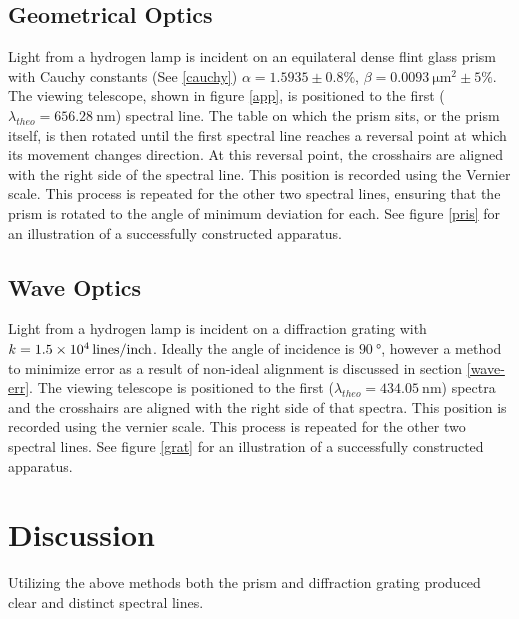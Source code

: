 \documentclass[10pt, twocolumn]{article}
\theoremstyle{definition}
\begin{document}
\subsection{Geometrical Optics}
Light from a hydrogen lamp is incident on an equilateral dense flint glass prism with Cauchy constants (See \eqref{cauchy})
$\alpha=1.5935\pm0.8\%$, $\beta=\qty{0.0093}{\micro\meter\squared}\pm5\%$. The viewing telescope, shown in figure \ref{app}, is positioned to the first ($\lambda_{theo}=\qty{656.28}{\nano\meter}$)
spectral line. The table on which the prism sits, or the prism itself, is then rotated until the first spectral line reaches a reversal point at which its movement changes direction.
At this reversal point, the crosshairs are aligned with the right side of the spectral line. This position is recorded using the Vernier scale. This process is repeated for the other two spectral lines,
ensuring that the prism is rotated to the angle of minimum deviation for each. See figure \ref{pris} for an illustration of a successfully constructed apparatus.
\subsection{Wave Optics}
Light from a hydrogen lamp is incident on a diffraction grating with $k=\qty{1.5d4}{lines\per inch}$. Ideally the angle of incidence is $\qty{90}{\degree}$,
however a method to minimize error as a result of non-ideal alignment is discussed in section \ref{wave-err}.
The viewing telescope is positioned to the first ($\lambda_{theo}=\qty{434.05}{\nano\meter}$) spectra and the crosshairs are aligned with the right side of
that spectra. This position is recorded using the vernier scale. This process is repeated for the other two spectral lines. See figure \ref{grat} for an illustration of a successfully constructed apparatus.
\section{Discussion}
Utilizing the above methods both the prism and diffraction grating produced clear and distinct spectral lines.
\end{document}
